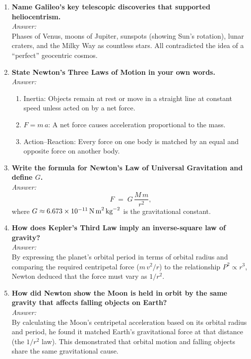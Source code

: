 \begin{enumerate}
  \item \textbf{Name Galileo’s key telescopic discoveries that supported heliocentrism.}\\
    \emph{Answer:}\\
    Phases of Venus, moons of Jupiter, sunspots (showing Sun’s rotation), lunar craters, and the Milky Way as countless stars. All contradicted the idea of a ``perfect'' geocentric cosmos.

  \item \textbf{State Newton’s Three Laws of Motion in your own words.}\\
    \emph{Answer:}\\
    \begin{enumerate}
      \item Inertia: Objects remain at rest or move in a straight line at constant speed unless acted on by a net force.
      \item $F = m\,a$: A net force causes acceleration proportional to the mass.
      \item Action--Reaction: Every force on one body is matched by an equal and opposite force on another body.
    \end{enumerate}

  \item \textbf{Write the formula for Newton’s Law of Universal Gravitation and define $G$.}\\
    \emph{Answer:}\\
    \[
      F \;=\; G \,\frac{M\,m}{r^2},
    \]
    where $G \approx 6.673\times 10^{-11}\,\text{N\,m}^2\,\text{kg}^{-2}$ is the gravitational constant.

  \item \textbf{How does Kepler’s Third Law imply an inverse-square law of gravity?}\\
    \emph{Answer:}\\
    By expressing the planet’s orbital period in terms of orbital radius and comparing the required centripetal force ($m\,v^2/r$) to the relationship $P^2 \propto r^3$, Newton deduced that the force must vary as $1/r^2$.

  \item \textbf{How did Newton show the Moon is held in orbit by the same gravity that affects falling objects on Earth?}\\
    \emph{Answer:}\\
    By calculating the Moon’s centripetal acceleration based on its orbital radius and period, he found it matched Earth’s gravitational force at that distance (the $1/r^2$ law). This demonstrated that orbital motion and falling objects share the same gravitational cause.
\end{enumerate}

